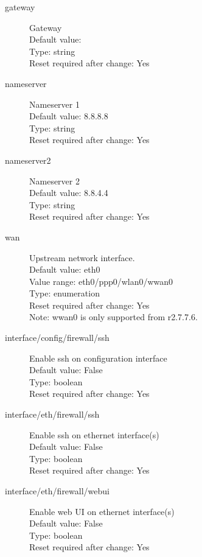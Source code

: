 \begin{description}
\item[gateway] Gateway\\
  Default value: \\
  Type: string\\
  Reset required after change: Yes\\

\item[nameserver] Nameserver 1\\
  Default value: 8.8.8.8\\
  Type: string\\
  Reset required after change: Yes\\

\item[nameserver2] Nameserver 2\\
  Default value: 8.8.4.4\\
  Type: string\\
  Reset required after change: Yes\\

\item[wan] Upstream network interface.\\
  Default value: eth0\\
  Value range: eth0/ppp0/wlan0/wwan0\\
  Type: enumeration\\
  Reset required after change: Yes\\
  Note: wwan0 is only supported from r2.7.7.6.\\

\item[interface/config/firewall/ssh] Enable ssh on configuration interface\\
  Default value: False\\
  Type: boolean\\
  Reset required after change: Yes\\

\item[interface/eth/firewall/ssh] Enable ssh on ethernet interface(s)\\
  Default value: False\\
  Type: boolean\\
  Reset required after change: Yes\\

\item[interface/eth/firewall/webui] Enable web UI on ethernet interface(s)\\
  Default value: False\\
  Type: boolean\\
  Reset required after change: Yes\\


\end{description}
